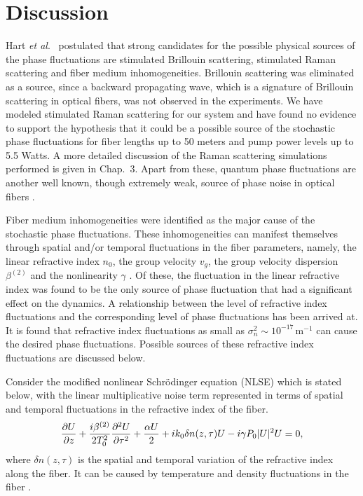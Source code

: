 \section{Discussion}

Hart {\it et al}.\ \cite{hart1} postulated that strong candidates for the possible 
physical sources of the phase fluctuations are stimulated Brillouin 
scattering, stimulated Raman scattering and fiber medium inhomogeneities. 
Brillouin scattering was eliminated as a source, since a backward propagating 
wave, which is a signature of Brillouin scattering in optical fibers, was not 
observed in the experiments. We have  modeled stimulated Raman scattering 
\cite{Agrawal8, headley} for our system and have found no evidence to
support the hypothesis that it could be a possible source of the stochastic phase 
fluctuations for fiber lengths up to 50 meters and pump power levels up to 5.5 Watts. 
A more detailed discussion of the Raman scattering simulations performed is given in Chap.\ 3.
Apart from these, quantum phase fluctuations are another well 
known, though extremely weak, source of phase noise in optical fibers 
\cite{Agrawal2,perlmutter1}.

Fiber medium inhomogeneities were identified as the major cause of the 
stochastic phase fluctuations. These inhomogeneities can manifest themselves 
through spatial and/or temporal fluctuations in the fiber parameters, namely, 
the linear refractive index $n_0$, the group velocity $v_g$, the group 
velocity dispersion $\beta^{(2)}$ and the nonlinearity 
$\gamma$ \cite{abdullaev}. Of these, the fluctuation in the linear refractive 
index was found to be the only source of phase fluctuation that had a 
significant effect on the dynamics. A relationship between the level of 
refractive index fluctuations and the  corresponding level of phase 
fluctuations has been arrived at. It is found that refractive index 
fluctuations as small as $\sigma_n^2 \sim 10^{-17}$\,m$^{-1}$ can cause the 
desired phase fluctuations. Possible sources of these refractive index 
fluctuations are discussed below.   

Consider the modified nonlinear Schr\"odinger equation (NLSE) which is
stated below, with the linear multiplicative noise term represented in terms of 
spatial and temporal fluctuations in the refractive index of the fiber.
\begin{equation}
{\partial U \over \partial z} + {i\beta^{(2)} \over 2T_0^2} {\partial^2U \over \partial\tau^2} + {\alpha U \over 2} + ik_0 \delta n(z,\tau)U - i\gamma P_{0}|U|^2 U = 0 ,
\end{equation}
where $\delta n(z,\tau)$ is the spatial and temporal variation of the refractive 
index along the fiber. It can be caused by temperature and density 
fluctuations in the fiber \cite{glenn}. 

